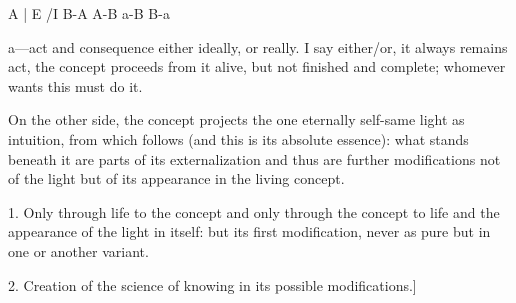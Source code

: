 A | E /I B-A A-B \R a-B B-a

a—act and consequence either ideally, or really.
I say either/or, it always remains act,
the concept proceeds from it alive,
but not finished and complete;
whomever wants this must do it.

On the other side, the concept projects
the one eternally self-same light as intuition,
from which follows (and this is its absolute essence):
what stands beneath it are parts of its externalization
and thus are further modifications not of the light
but of its appearance in the living concept.

1. Only through life to the concept
and only through the concept to life
and the appearance of the light in itself:
but its first modification, never as pure
but in one or another variant.

2. Creation of the science of knowing
in its possible modifications.]
